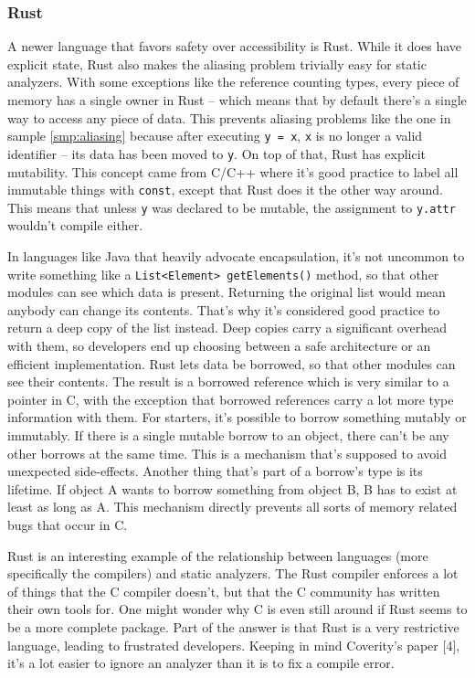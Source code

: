 \documentclass[a4paper, 16pt, oneside]{Thesis}
\begin{document}
\subsubsection{Rust}\label{rust}

A newer language that favors safety over accessibility is Rust. While it
does have explicit state, Rust also makes the aliasing problem trivially
easy for static analyzers. With some exceptions like the reference
counting types, every piece of memory has a single owner in Rust --
which means that by default there's a single way to access any piece of
data. This prevents aliasing problems like the one in sample
\ref{smp:aliasing} because after executing \texttt{y\ =\ x}, \texttt{x}
is no longer a valid identifier -- its data has been moved to
\texttt{y}. On top of that, Rust has explicit mutability. This concept
came from C/C++ where it's good practice to label all immutable things
with \texttt{const}, except that Rust does it the other way around. This
means that unless \texttt{y} was declared to be mutable, the assignment
to \texttt{y.attr} wouldn't compile either.

In languages like Java that heavily advocate encapsulation, it's not
uncommon to write something like a
\texttt{List\textless{}Element\textgreater{}\ getElements()} method, so
that other modules can see which data is present. Returning the original
list would mean anybody can change its contents. That's why it's
considered good practice to return a deep copy of the list instead. Deep
copies carry a significant overhead with them, so developers end up
choosing between a safe architecture or an efficient implementation.
Rust lets data be borrowed, so that other modules can see their
contents. The result is a borrowed reference which is very similar to a
pointer in C, with the exception that borrowed references carry a lot
more type information with them. For starters, it's possible to borrow
something mutably or immutably. If there is a single mutable borrow to
an object, there can't be any other borrows at the same time. This is a
mechanism that's supposed to avoid unexpected side-effects. Another
thing that's part of a borrow's type is its lifetime. If object A wants
to borrow something from object B, B has to exist at least as long as A.
This mechanism directly prevents all sorts of memory related bugs that
occur in C.

Rust is an interesting example of the relationship between languages
(more specifically the compilers) and static analyzers. The Rust
compiler enforces a lot of things that the C compiler doesn't, but that
the C community has written their own tools for. One might wonder why C
is even still around if Rust seems to be a more complete package. Part
of the answer is that Rust is a very restrictive language, leading to
frustrated developers. Keeping in mind Coverity's paper {[}4{]}, it's a
lot easier to ignore an analyzer than it is to fix a compile error.
\end{document}
